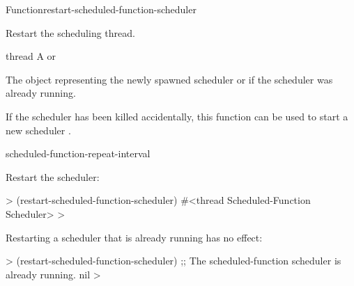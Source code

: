 \begin{functiondoc}{Function}{restart-scheduled-function-scheduler}%
  {\noargs{} \returns{} }
%

\fnsyntax

\fnpurpose Restart the  scheduling thread.

\fnpackage {}

\fnmodule {}

\fnargs
\begin{args}{thread}
\arg[thread] A  or \nil{}
\end{args}

\fnreturns The object representing the newly spawned
 scheduler  or \nil{} if the
 scheduler was already running.

\fnerrors
\nothreads{}

\fndescription If the  scheduler  has
been killed accidentally, this function can be used to start a new scheduler
.

\begin{alsos}{scheduled-function-repeat-interval}
\end{alsos}

\fnexamples
Restart the  scheduler:
%
\W\supp
\begin{example}
  > (restart-scheduled-function-scheduler)
  #<thread Scheduled-Function Scheduler>
  >
\end{example}
%
Restarting a  scheduler that is already running has
no effect:
%
\W\supp\notpretop
\begin{example}
  > (restart-scheduled-function-scheduler)
  ;; The scheduled-function scheduler is already running.
  nil
  >
\end{example}

\end{functiondoc}


